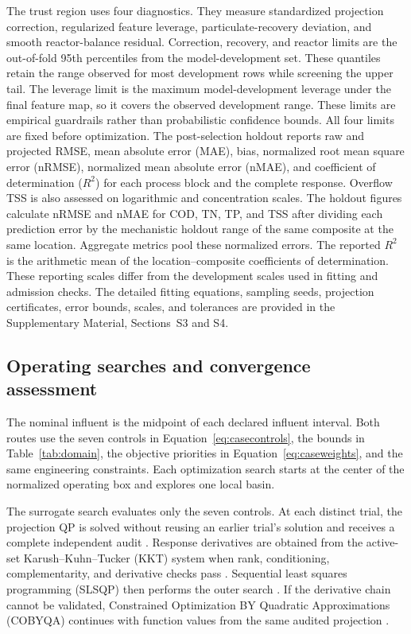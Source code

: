 \documentclass[a4paper,fleqn]{cas-sc}
\begin{document}
The trust region uses four diagnostics. They measure standardized projection correction, regularized feature leverage, particulate-recovery deviation, and smooth reactor-balance residual. Correction, recovery, and reactor limits are the out-of-fold 95th percentiles from the model-development set. These quantiles retain the range observed for most development rows while screening the upper tail. The leverage limit is the maximum model-development leverage under the final feature map, so it covers the observed development range. These limits are empirical guardrails rather than probabilistic confidence bounds. All four limits are fixed before optimization. The post-selection holdout reports raw and projected RMSE, mean absolute error (MAE), bias, normalized root mean square error (nRMSE), normalized mean absolute error (nMAE), and coefficient of determination ($R^2$) for each process block and the complete response. Overflow TSS is also assessed on logarithmic and concentration scales. The holdout figures calculate nRMSE and nMAE for COD, TN, TP, and TSS after dividing each prediction error by the mechanistic holdout range of the same composite at the same location. Aggregate metrics pool these normalized errors. The reported $R^2$ is the arithmetic mean of the location--composite coefficients of determination. These reporting scales differ from the development scales used in fitting and admission checks. The detailed fitting equations, sampling seeds, projection certificates, error bounds, scales, and tolerances are provided in the Supplementary Material, Sections~S3 and S4.

\subsection{Operating searches and convergence assessment}

The nominal influent is the midpoint of each declared influent interval. Both routes use the seven controls in Equation~\eqref{eq:casecontrols}, the bounds in Table~\ref{tab:domain}, the objective priorities in Equation~\eqref{eq:caseweights}, and the same engineering constraints. Each optimization search starts at the center of the normalized operating box and explores one local basin.

The surrogate search evaluates only the seven controls. At each distinct trial, the projection QP is solved without reusing an earlier trial's solution and receives a complete independent audit \citep{Stellato2020,Boyd2004}. Response derivatives are obtained from the active-set Karush--Kuhn--Tucker (KKT) system when rank, conditioning, complementarity, and derivative checks pass \citep{Tondel2003}. Sequential least squares programming (SLSQP) then performs the outer search \citep{Kraft1988}. If the derivative chain cannot be validated, Constrained Optimization BY Quadratic Approximations (COBYQA) continues with function values from the same audited projection \citep{Ragonneau2022}.
\end{document}
